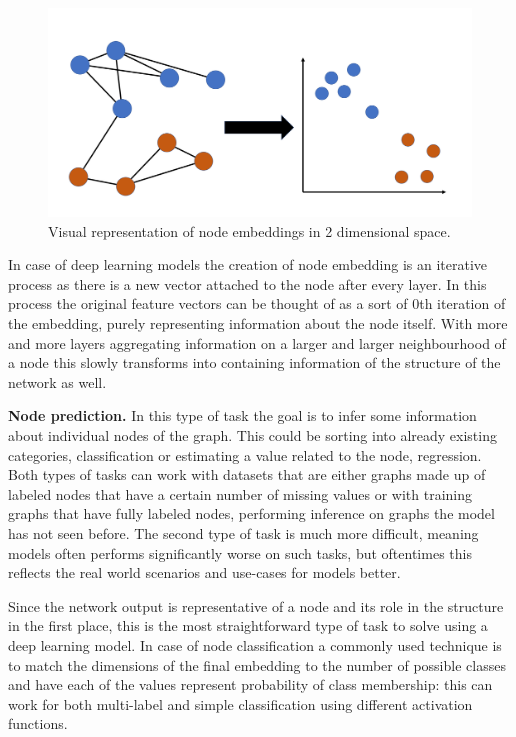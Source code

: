 	\begin{figure}[!h]
		\centering
		\includegraphics[width=\textwidth]{figures/embedding.png}
		\caption{Visual representation of node embeddings in 2 dimensional space.}
		\label{fig:embedding}
	\end{figure}
	
	In case of deep learning models the creation of node embedding is an iterative process as there is a new vector attached to the node after every layer. In this process the original feature vectors can be thought of as a sort of 0th iteration of the embedding, purely representing information about the node itself. With more and more layers aggregating information on a larger and larger neighbourhood of a node this slowly transforms into containing information of the structure of the network as well.
	
	
	\textbf{Node prediction.} In this type of task the goal is to infer some information about individual nodes of the graph. This could be sorting into already existing categories, classification or estimating a value related to the node, regression. Both types of tasks can work with datasets that are either graphs made up of labeled nodes that have a certain number of missing values or with training graphs that have fully labeled nodes, performing inference on graphs the model has not seen before. The second type of task is much more difficult, meaning models often performs significantly worse on such tasks, but oftentimes this reflects the real world scenarios and use-cases for models better.
	
	Since the network output is representative of a node and its role in the structure in the first place, this is the most straightforward type of task to solve using a deep learning model. In case of node classification a commonly used technique is to match the dimensions of the final embedding to the number of possible classes and have each of the values represent probability of class membership: this can work for both multi-label and simple classification using different activation functions.
	
